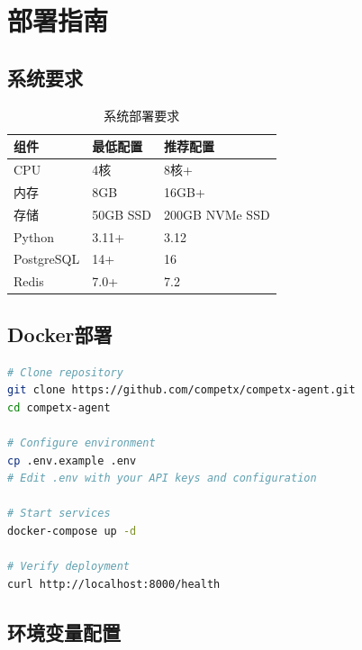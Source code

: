 \documentclass[12pt,a4paper]{ctexrep}
\begin{document}
\chapter{部署指南}

\section{系统要求}

\begin{table}[H]
\centering
\caption{系统部署要求}
\label{tab:deploy-req}
{\small
\begin{tabular}{p{3cm} p{4cm} p{6cm}}
\toprule
\textbf{组件} & \textbf{最低配置} & \textbf{推荐配置} \\
\midrule
CPU & 4核 & 8核+ \\
内存 & 8GB & 16GB+ \\
存储 & 50GB SSD & 200GB NVMe SSD \\
Python & 3.11+ & 3.12 \\
PostgreSQL & 14+ & 16 \\
Redis & 7.0+ & 7.2 \\
\bottomrule
\end{tabular}
}
\end{table}

\section{Docker部署}

\begin{lstlisting}[language=bash,caption=Docker Compose部署]
# Clone repository
git clone https://github.com/competx/competx-agent.git
cd competx-agent

# Configure environment
cp .env.example .env
# Edit .env with your API keys and configuration

# Start services
docker-compose up -d

# Verify deployment
curl http://localhost:8000/health
\end{lstlisting}

\section{环境变量配置}
\end{document}
